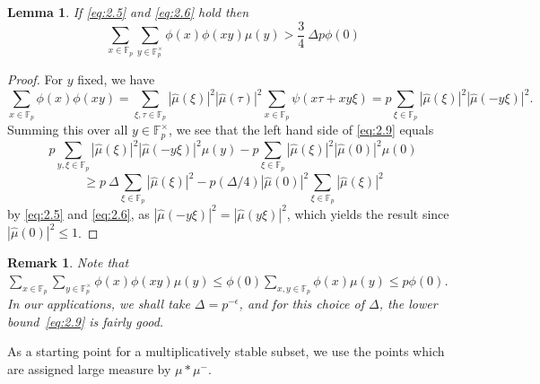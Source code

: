 \documentclass[11pt]{amsart}
\newtheorem{lem}[thm]{Lemma}
\newtheorem{remark}{Remark}
\newcommand{\fp}{\mathbb{F}_p}
\newcommand{\muhat}{{\widehat{\mu}}}
\begin{document}
\begin{lem} If \eqref{eq:2.5} and \eqref{eq:2.6} hold then
\begin{equation}
\label{eq:2.9} \sum_{x \in \fp} \sum_{y \in \fp^\times} \phi(x)
\phi(xy) \mu(y)
> \frac 34 \ \Delta p\phi(0)
\end{equation}
\end{lem}
\begin{proof}
For $y$ fixed, we have
$$
\sum_{x \in \fp} \phi(x) \phi(xy) = \sum_{\xi, \tau \in \fp}
|\muhat(\xi)|^2 |\muhat(\tau)|^2 \sum_{x \in \fp}
\psi(x\tau+xy\xi) = p \sum_{\xi \in \fp} |\muhat(\xi)|^2
|\muhat(-y \xi)|^2.
$$
Summing this over all $y \in \fp^\times$, we see that  the left hand
side of \eqref{eq:2.9}  equals
$$
p \sum_{y,\xi \in \fp} |\muhat(\xi)|^2 |\muhat(-y \xi)|^2 \mu(y) - p
\sum_{\xi \in \fp} |\muhat(\xi)|^2 |\muhat(0)|^2 \mu(0)
$$
$$
\geq p\ \Delta \sum_{\xi \in \fp} |\muhat(\xi)|^2 -p (\Delta/4)
|\muhat(0)|^2 \sum_{\xi \in \fp} |\muhat(\xi)|^2
$$
by \eqref{eq:2.5} and \eqref{eq:2.6}, as  $|\muhat(-y\xi)|^2 =
|\muhat(y\xi)|^2$, which yields the result since  $|\muhat(0)|^2
\leq 1$.
\end{proof}
\begin{remark}
Note that $\sum_{x \in \fp} \sum_{y \in \fp^\times} \phi(x) \phi(xy)
\mu(y) \leq \phi(0) \sum_{x,y \in \fp} \phi(x) \mu(y) \leq p
\phi(0)$.  In our applications, we shall take $\Delta =p^{-\epsilon}$,
and for this choice of $\Delta$, the lower bound~\eqref{eq:2.9} is
fairly good. 
\end{remark}

As a starting point for a  multiplicatively stable subset, we use
the points which are assigned large measure by  $\mu \ast \mu^-$.
\end{document}

